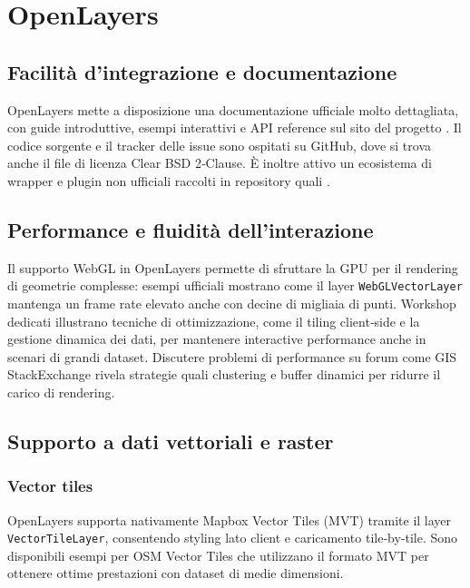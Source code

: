 \section{OpenLayers}
\label{ch:openlayers}

\subsection{Facilità d'integrazione e documentazione}
OpenLayers mette a disposizione una documentazione ufficiale molto dettagliata, con guide introduttive, esempi interattivi e API reference sul sito del progetto \cite{openlayers-doc}.  
Il codice sorgente e il tracker delle issue sono ospitati su GitHub, dove si trova anche il file di licenza Clear BSD 2‑Clause.
È inoltre attivo un ecosistema di wrapper e plugin non ufficiali raccolti in repository quali  \cite{openlayers-github,awesome-openlayers}.

\subsection{Performance e fluidità dell'interazione}
Il supporto WebGL in OpenLayers permette di sfruttare la GPU per il rendering di geometrie complesse: esempi ufficiali mostrano come il layer \texttt{WebGLVectorLayer} mantenga un frame rate elevato anche con decine di migliaia di punti. \cite{openlayers-webgl-example} 
Workshop dedicati illustrano tecniche di ottimizzazione, come il tiling client‑side e la gestione dinamica dei dati, per mantenere interactive performance anche in scenari di grandi dataset.
Discutere problemi di performance su forum come GIS StackExchange rivela strategie quali clustering e buffer dinamici per ridurre il carico di rendering. \cite{openlayers-webgl-workshop,openlayers-issue-perf}

\subsection{Supporto a dati vettoriali e raster}
\subsubsection*{Vector tiles}
OpenLayers supporta nativamente Mapbox Vector Tiles (MVT) tramite il layer \texttt{VectorTileLayer}, consentendo styling lato client e caricamento tile‑by‑tile.
Sono disponibili esempi per OSM Vector Tiles che utilizzano il formato MVT per ottenere ottime prestazioni con dataset di medie dimensioni. \cite{openlayers-mapbox-vector-tiles,openlayers-osm-vector-tiles}

